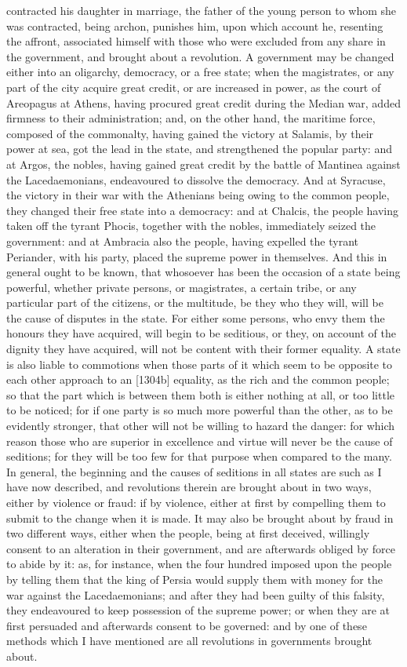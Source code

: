 contracted his daughter in marriage, the father of the young person to
whom she was contracted, being archon, punishes him, upon which account
he, resenting the affront, associated himself with those who were excluded
from any share in the government, and brought about a revolution. A
government may be changed either into an oligarchy, democracy, or a free
state; when the magistrates, or any part of the city acquire great credit,
or are increased in power, as the court of Areopagus at Athens, having
procured great credit during the Median war, added firmness to their
administration; and, on the other hand, the maritime force, composed of
the commonalty, having gained the victory at Salamis, by their power at
sea, got the lead in the state, and strengthened the popular party: and at
Argos, the nobles, having gained great credit by the battle of Mantinea
against the Lacedaemonians, endeavoured to dissolve the democracy. And at
Syracuse, the victory in their war with the Athenians being owing to the
common people, they changed their free state into a democracy: and at
Chalcis, the people having taken off the tyrant Phocis, together with the
nobles, immediately seized the government: and at Ambracia also the
people, having expelled the tyrant Periander, with his party, placed the
supreme power in themselves. And this in general ought to be known, that
whosoever has been the occasion of a state being powerful, whether private
persons, or magistrates, a certain tribe, or any particular part of the
citizens, or the multitude, be they who they will, will be the cause of
disputes in the state. For either some persons, who envy them the honours
they have acquired, will begin to be seditious, or they, on account of the
dignity they have acquired, will not be content with their former
equality. A state is also liable to commotions when those parts of it
which seem to be opposite to each other approach to an [1304b] equality,
as the rich and the common people; so that the part which is between them
both is either nothing at all, or too little to be noticed; for if one
party is so much more powerful than the other, as to be evidently
stronger, that other will not be willing to hazard the danger: for which
reason those who are superior in excellence and virtue will never be the
cause of seditions; for they will be too few for that purpose when
compared to the many. In general, the beginning and the causes of
seditions in all states are such as I have now described, and revolutions
therein are brought about in two ways, either by violence or fraud: if by
violence, either at first by compelling them to submit to the change when
it is made. It may also be brought about by fraud in two different ways,
either when the people, being at first deceived, willingly consent to an
alteration in their government, and are afterwards obliged by force to
abide by it: as, for instance, when the four hundred imposed upon the
people by telling them that the king of Persia would supply them with
money for the war against the Lacedaemonians; and after they had been
guilty of this falsity, they endeavoured to keep possession of the supreme
power; or when they are at first persuaded and afterwards consent to be
governed: and by one of these methods which I have mentioned are all
revolutions in governments brought about.

